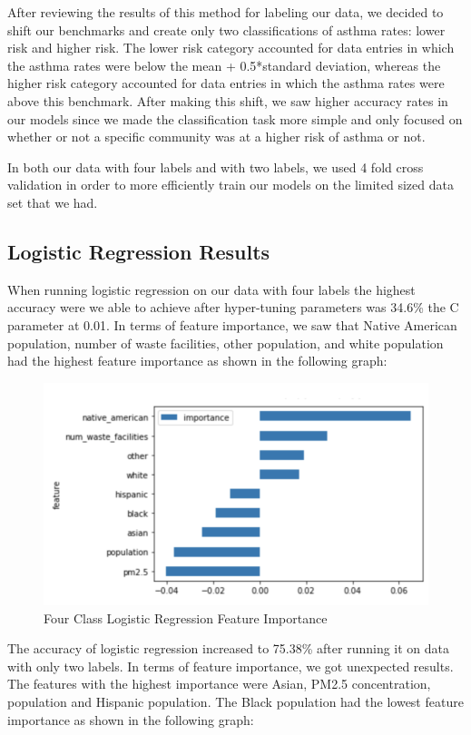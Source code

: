 \documentclass{article}
\begin{document}
After reviewing the results of this method for labeling our data, we decided to shift our benchmarks and create only two classifications of asthma rates: lower risk and higher risk. The lower risk category accounted for data entries in which the asthma rates were below the mean + 0.5*standard deviation, whereas the higher risk category accounted for data entries in which the asthma rates were above this benchmark. After making this shift, we saw higher accuracy rates in our models since we made the classification task more simple and only focused on whether or not a specific community was at a higher risk of asthma or not. 

In both our data with four labels and with two labels, we used 4 fold cross validation in order to more efficiently train our models on the limited sized data set that we had. 

\subsection{Logistic Regression Results}
\label{logistic regression results}

When running logistic regression on our data with four labels the highest accuracy were we able to achieve after hyper-tuning parameters was 34.6\%  the C parameter at 0.01. In terms of feature importance, we saw that Native American population, number of waste facilities, other population, and white population had the highest  feature importance as shown in the following graph: 

\begin{figure}[h]
\caption{Four Class Logistic Regression Feature Importance}
\centering
\includegraphics[scale=0.6]{4ClassLogReg.png}
\end{figure}

The accuracy of logistic regression increased to 75.38\% after running it on data with only two labels. In terms of feature importance, we got unexpected results. The features with the highest importance were Asian, PM2.5 concentration, population and Hispanic population. The Black population had the lowest feature importance as shown in the following graph:
\end{document}
